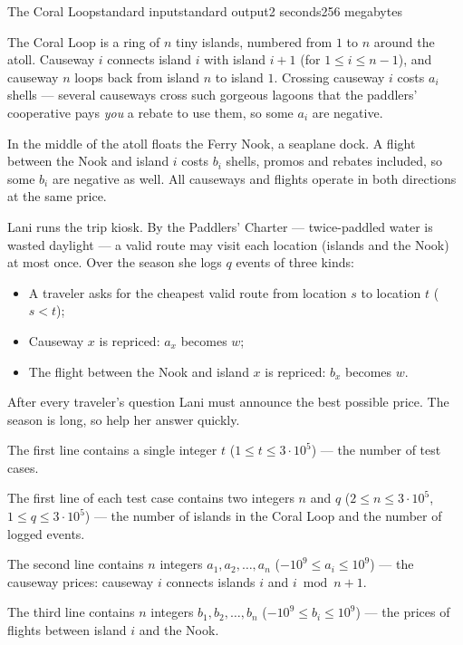 \begin{problem}{The Coral Loop}{standard input}{standard output}{2 seconds}{256 megabytes}

The Coral Loop is a ring of $n$ tiny islands, numbered from $1$ to $n$ around the atoll. Causeway $i$ connects island $i$ with island $i+1$ (for $1 \le i \le n-1$), and causeway $n$ loops back from island $n$ to island $1$. Crossing causeway $i$ costs $a_i$ shells --- several causeways cross such gorgeous lagoons that the paddlers' cooperative pays \emph{you} a rebate to use them, so some $a_i$ are negative.

In the middle of the atoll floats the Ferry Nook, a seaplane dock. A flight between the Nook and island $i$ costs $b_i$ shells, promos and rebates included, so some $b_i$ are negative as well. All causeways and flights operate in both directions at the same price.

Lani runs the trip kiosk. By the Paddlers' Charter --- twice-paddled water is wasted daylight --- a valid route may visit each location (islands and the Nook) at most once. Over the season she logs $q$ events of three kinds:

\begin{itemize}
\item A traveler asks for the cheapest valid route from location $s$ to location $t$ ($s < t$);
\item Causeway $x$ is repriced: $a_x$ becomes $w$;
\item The flight between the Nook and island $x$ is repriced: $b_x$ becomes $w$.
\end{itemize}

After every traveler's question Lani must announce the best possible price. The season is long, so help her answer quickly.


\InputFile
The first line contains a single integer $t$ ($1 \le t \le 3 \cdot 10^5$) --- the number of test cases.

The first line of each test case contains two integers $n$ and $q$ ($2 \le n \le 3 \cdot 10^5$, $1 \le q \le 3 \cdot 10^5$) --- the number of islands in the Coral Loop and the number of logged events.

The second line contains $n$ integers $a_1, a_2, \ldots, a_n$ ($-10^9 \le a_i \le 10^9$) --- the causeway prices: causeway $i$ connects islands $i$ and $i \bmod n + 1$.

The third line contains $n$ integers $b_1, b_2, \ldots, b_n$ ($-10^9 \le b_i \le 10^9$) --- the prices of flights between island $i$ and the Nook.


\end{problem}
